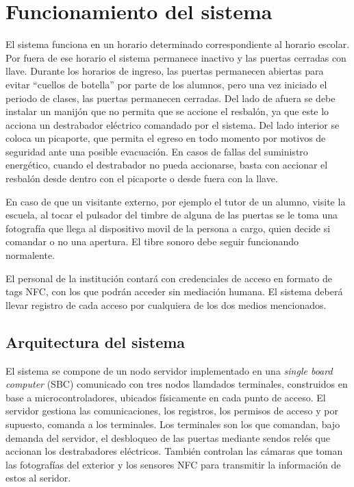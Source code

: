 \newpage
\section{Funcionamiento del sistema}
El sistema funciona en un horario determinado correspondiente al horario escolar. Por fuera de ese horario el sistema permanece inactivo y las puertas cerradas con llave.
Durante los horarios de ingreso, las puertas permanecen abiertas para evitar \enquote{cuellos de botella} por parte de los alumnos, pero una vez iniciado el periodo de clases, las puertas permanecen cerradas. Del lado de afuera se debe instalar un manijón que no permita que se accione el resbalón, ya que este lo acciona un destrabador eléctrico comandado por el sistema. Del lado interior se coloca un picaporte, que permita el egreso en todo momento por motivos de seguridad ante una posible evacuación.
En casos de fallas del suministro energético, cuando el destrabador no pueda accionarse, basta con accionar el resbalón desde dentro con el picaporte o desde fuera con la llave.

En caso de que un visitante externo, por ejemplo el tutor de un alumno, visite la escuela, al tocar el pulsador del timbre de alguna de las puertas se le toma una fotografía que llega al dispositivo movil de la persona a cargo, quien decide si comandar o no una apertura. El tibre sonoro debe seguir funcionando normalente.

El personal de la institución contará con credenciales de acceso en formato de tags NFC, con los que podrán acceder sin mediación humana. El sistema deberá llevar registro de cada acceso por cualquiera de los dos medios mencionados. 


\subsection{Arquitectura del sistema}
El sistema se compone de un nodo servidor implementado en una \textit{single board computer} (SBC) comunicado con tres nodos llamdados terminales, construidos en base a microcontroladores, ubicados físicamente en cada punto de acceso. El servidor gestiona las comunicaciones, los registros, los permisos de acceso y por supuesto, comanda a los terminales. Los terminales son los que comandan, bajo demanda del servidor, el desbloqueo de las puertas mediante sendos relés que accionan los destrabadores eléctricos. También controlan las cámaras que toman las fotografías del exterior y los sensores NFC para transmitir la información de estos al seridor. 

